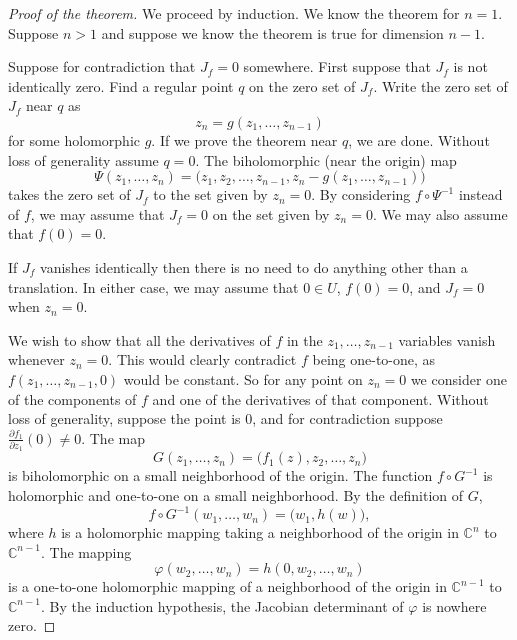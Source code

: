 \documentclass[12pt,openany]{book}
\newcommand{\C}{{\mathbb{C}}}
\theoremstyle{plain}
\theoremstyle{remark}
\theoremstyle{definition}
\theoremstyle{exercise}
\theoremstyle{example}
\begin{document}
\begin{proof}[Proof of the theorem]
We proceed by induction.  We know the theorem for $n=1$.
Suppose $n > 1$ and suppose we know the theorem is true for dimension $n-1$.

Suppose for contradiction that $J_f = 0$ somewhere.
First suppose that $J_f$ is not identically zero.
Find a regular point $q$ on the zero set of $J_f$.
Write the zero set of $J_f$ near $q$ as
\begin{equation*}
z_n = g(z_1,\ldots,z_{n-1})
\end{equation*}
for some holomorphic $g$.
If we prove the theorem near $q$, we are done.  Without loss of generality
assume $q=0$.  The biholomorphic (near the origin) map
\begin{equation*}
\Psi(z_1,\ldots,z_n) = \bigl(z_1,z_2,\ldots,z_{n-1},z_n-g(z_1,\ldots,z_{n-1}) \bigr)
\end{equation*}
takes the zero set of $J_f$ to the set given by $z_n=0$.  By considering
$f \circ \Psi^{-1}$ instead of $f$, we may assume
that $J_f = 0$ on the set given by $z_n=0$.  We may also
assume that $f(0) = 0$.

If $J_f$ vanishes identically then there is no need to do anything other
than a translation.  In either case,
we may assume that $0 \in U$, $f(0)=0$, and
$J_f = 0$ when $z_n=0$.

We wish to show that all the derivatives of $f$ in the $z_1,\ldots,z_{n-1}$
variables vanish whenever $z_n = 0$.  This
would clearly contradict $f$ being one-to-one,
as $f(z_1,\ldots,z_{n-1},0)$ would be constant.
So for any point on $z_n=0$ we consider one of the components
of $f$ and one of the derivatives of that component.
Without loss of generality, suppose the point is 0, and
for contradiction suppose
$\frac{\partial f_1}{\partial z_1}(0) \not= 0$.
The map
\begin{equation*}
G(z_1,\ldots,z_n) = \bigl(f_1(z),z_2,\ldots,z_n\bigr)
\end{equation*}
is biholomorphic on a small neighborhood of the origin.
The function $f \circ G^{-1}$ is holomorphic and one-to-one on a small
neighborhood.  By the definition of $G$,
\begin{equation*}
f \circ G^{-1} (w_1,\ldots,w_n) = \bigl(w_1,h(w)\bigr) ,
\end{equation*}
where $h$ is a holomorphic mapping taking a neighborhood of the
origin in $\C^n$ to $\C^{n-1}$.
The mapping
\begin{equation*}
\varphi(w_2,\ldots,w_n) = h(0,w_2,\ldots,w_n)
\end{equation*}
is a one-to-one holomorphic mapping of a neighborhood of the origin in
$\C^{n-1}$ to $\C^{n-1}$.  By the induction hypothesis, the Jacobian determinant of
$\varphi$ is nowhere zero.


\end{proof}
\end{document}
